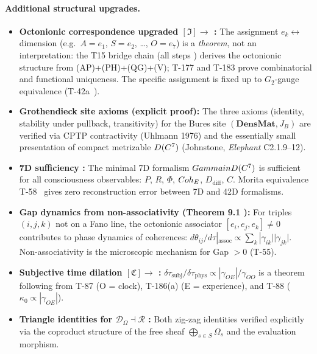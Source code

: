 \paragraph{Additional structural upgrades.}
\begin{itemize}[leftmargin=2em,nosep]
  \item \textbf{Octonionic correspondence upgraded $[\mathfrak{I}] \to$ :}
        The assignment $e_k \leftrightarrow$ dimension (e.g.\ $A = e_1$, $S = e_2$, \ldots,
        $O = e_7$) is a \emph{theorem}, not an interpretation: the T15 bridge chain
        (all steps ) derives the octonionic structure from (AP)+(PH)+(QG)+(V);
        T-177 and T-183 prove combinatorial and functional uniqueness.
        The specific assignment is fixed up to $G_2$-gauge equivalence (T-42a~).
  \item \textbf{Grothendieck site axioms (explicit proof):}
        The three axioms (identity, stability under pullback, transitivity) for the Bures
        site $(\mathbf{DensMat}, J_B)$ are verified via CPTP contractivity (Uhlmann 1976)
        and the essentially small presentation of compact metrizable $D(C^7)$
        (Johnstone, \emph{Elephant} C2.1.9--12).
  \item \textbf{7D sufficiency :}
        The minimal 7D formalism $Gamma in D(C^7)$ is sufficient for all
        consciousness observables: $P$, $R$, $\Phi$, $Coh_E$, $D_{\mathrm{diff}}$, $C$.
        Morita equivalence T-58~ gives zero reconstruction error between 7D
        and 42D formalisms.
  \item \textbf{Gap dynamics from non-associativity (Theorem 9.1 ):}
        For triples $(i,j,k)$ not on a Fano line, the octonionic associator
        $[e_i, e_j, e_k] \neq 0$ contributes to phase dynamics of coherences:
        $d\theta_{ij}/d\tau|_{\mathrm{assoc}} \propto \sum_{k} |\gamma_{ik}||\gamma_{jk}|$.
        Non-associativity is the microscopic mechanism for Gap $> 0$ (T-55).
  \item \textbf{Subjective time dilation $[\mathfrak{C}] \to$ :}
        $\delta\tau_{\mathrm{subj}}/\delta\tau_{\mathrm{phys}} \propto |\gamma_{OE}|/\gamma_{OO}$
        is a theorem following from T-87 (O = clock), T-186(a) (E = experience),
        and T-88 ($\kappa_0 \propto |\gamma_{OE}|$).
  \item \textbf{Triangle identities for $\mathcal{D}_\Omega \dashv \mathcal{R}$ :}
        Both zig-zag identities verified explicitly via the coproduct structure of the
        free sheaf $\bigoplus_{s \in S} \Omega_s$ and the evaluation morphism.
\end{itemize}

